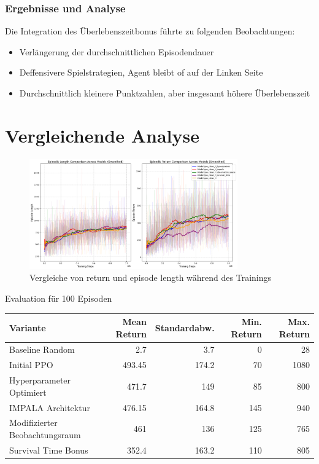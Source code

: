 \documentclass{article}
\begin{document}
\subsubsection{Ergebnisse und Analyse}
Die Integration des Überlebenszeitbonus führte zu folgenden Beobachtungen:
\begin{itemize}
    \item Verlängerung der durchschnittlichen Episodendauer
    \item Deffensivere Spielstrategien, Agent bleibt of auf der Linken Seite
    \item Durchschnittlich kleinere Punktzahlen, aber insgesamt höhere Überlebenszeit
\end{itemize}


\newpage

\section{Vergleichende Analyse}
\begin{figure}[H]
    \centering
    \includegraphics[width=0.8\textwidth]{./Figure_3.png}
    \caption{Vergleiche von return und episode length während des Trainings}
\end{figure}

Evaluation für 100 Episoden

\begin{tabular}{lrrrr}
\toprule
Variante & Mean Return & Standardabw. & Min. Return & Max. Return \\
\midrule
Baseline Random & 2.7 & 3.7 & 0 & 28 \\
Initial PPO & 493.45 & 174.2 & 70 & 1080 \\
Hyperparameter Optimiert & 471.7 & 149 & 85 & 800 \\
IMPALA Architektur & 476.15 & 164.8 & 145 & 940 \\
Modifizierter Beobachtungsraum & 461 & 136 & 125 & 765 \\
Survival Time Bonus & 352.4 & 163.2 & 110 & 805 \\
\bottomrule
\end{tabular}
\end{document}
